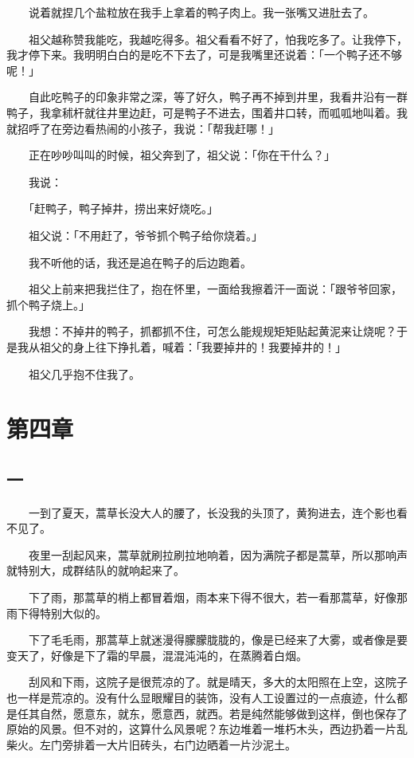 \documentclass[UTF8]{ctexart}
\begin{document}
　　说着就捏几个盐粒放在我手上拿着的鸭子肉上。我一张嘴又进肚去了。

　　祖父越称赞我能吃，我越吃得多。祖父看看不好了，怕我吃多了。让我停下，我才停下来。我明明白白的是吃不下去了，可是我嘴里还说着：「一个鸭子还不够呢！」

　　自此吃鸭子的印象非常之深，等了好久，鸭子再不掉到井里，我看井沿有一群鸭子，我拿秫杆就往井里边赶，可是鸭子不进去，围着井口转，而呱呱地叫着。我就招呼了在旁边看热闹的小孩子，我说：「帮我赶哪！」

　　正在吵吵叫叫的时候，祖父奔到了，祖父说：「你在干什么？」

　　我说：

　　「赶鸭子，鸭子掉井，捞出来好烧吃。」

　　祖父说：「不用赶了，爷爷抓个鸭子给你烧着。」

　　我不听他的话，我还是追在鸭子的后边跑着。

　　祖父上前来把我拦住了，抱在怀里，一面给我擦着汗一面说：「跟爷爷回家，抓个鸭子烧上。」

　　我想：不掉井的鸭子，抓都抓不住，可怎么能规规矩矩贴起黄泥来让烧呢？于是我从祖父的身上往下挣扎着，喊着：「我要掉井的！我要掉井的！」

　　祖父几乎抱不住我了。

\section{第四章}

\subsection{一}

　　一到了夏天，蒿草长没大人的腰了，长没我的头顶了，黄狗进去，连个影也看不见了。

　　夜里一刮起风来，蒿草就刷拉刷拉地响着，因为满院子都是蒿草，所以那响声就特别大，成群结队的就响起来了。

　　下了雨，那蒿草的梢上都冒着烟，雨本来下得不很大，若一看那蒿草，好像那雨下得特别大似的。

　　下了毛毛雨，那蒿草上就迷漫得朦朦胧胧的，像是已经来了大雾，或者像是要变天了，好像是下了霜的早晨，混混沌沌的，在蒸腾着白烟。

　　刮风和下雨，这院子是很荒凉的了。就是晴天，多大的太阳照在上空，这院子也一样是荒凉的。没有什么显眼耀目的装饰，没有人工设置过的一点痕迹，什么都是任其自然，愿意东，就东，愿意西，就西。若是纯然能够做到这样，倒也保存了原始的风景。但不对的，这算什么风景呢？东边堆着一堆朽木头，西边扔着一片乱柴火。左门旁排着一大片旧砖头，右门边晒着一片沙泥土。
\end{document}
